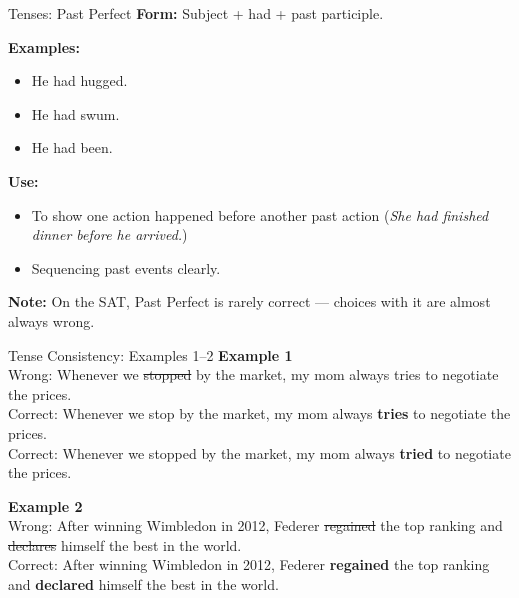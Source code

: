 \documentclass[aspectratio=169,11pt]{beamer}
\begin{document}
\begin{frame}{Tenses: Past Perfect}
\small
\textbf{Form:} Subject + had + past participle.  

\textbf{Examples:}
\begin{itemize}
  \item He had hugged.
  \item He had swum.
  \item He had been.
\end{itemize}

\textbf{Use:}
\begin{itemize}
  \item To show one action happened before another past action (\emph{She had finished dinner before he arrived.})
  \item Sequencing past events clearly.
\end{itemize}

\textbf{Note:} On the SAT, Past Perfect is rarely correct — choices with it are almost always wrong.
\end{frame}

\begin{frame}{Tense Consistency: Examples 1–2}
\small
\textbf{Example 1} \\
Wrong: Whenever we \sout{stopped} by the market, my mom always tries to negotiate the prices. \\
Correct: Whenever we stop by the market, my mom always \textbf{tries} to negotiate the prices. \\
Correct: Whenever we stopped by the market, my mom always \textbf{tried} to negotiate the prices.  

\vspace{0.8em}
\textbf{Example 2} \\
Wrong: After winning Wimbledon in 2012, Federer \sout{regained} the top ranking and \sout{declares} himself the best in the world. \\
Correct: After winning Wimbledon in 2012, Federer \textbf{regained} the top ranking and \textbf{declared} himself the best in the world.
\end{frame}
\end{document}
